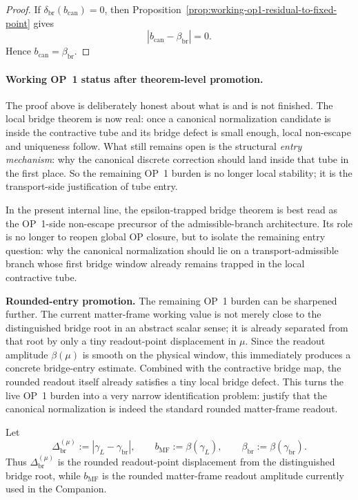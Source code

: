 \begin{proof}
If \(\delta_{\mathrm{br}}(b_{\mathrm{can}})=0\), then Proposition~\ref{prop:working-op1-residual-to-fixed-point} gives
\[
  |b_{\mathrm{can}}-\beta_{\mathrm{br}}|=0.
\]
Hence \(b_{\mathrm{can}}=\beta_{\mathrm{br}}\).
\end{proof}

\paragraph{Working OP~1 status after theorem-level promotion.}
The proof above is deliberately honest about what is and is not finished. The local bridge theorem is now real: once a canonical normalization candidate is inside the contractive tube and its bridge defect is small enough, local non-escape and uniqueness follow. What still remains open is the structural \emph{entry mechanism}: why the canonical discrete correction should land inside that tube in the first place. So the remaining OP~1 burden is no longer local stability; it is the transport-side justification of tube entry.

\begin{remark}
In the present internal line, the epsilon-trapped bridge theorem is best read as the OP~1-side non-escape precursor of the admissible-branch architecture. Its role is no longer to reopen global OP closure, but to isolate the remaining entry question: why the canonical normalization should lie on a transport-admissible branch whose first bridge window already remains trapped in the local contractive tube.
\end{remark}


\noindent\textbf{Rounded-entry promotion.} The remaining OP~1 burden can be sharpened further. The current matter-frame working value is not merely close to the distinguished bridge root in an abstract scalar sense; it is already separated from that root by only a tiny readout-point displacement in \(\mu\). Since the readout amplitude \(\beta(\mu)\) is smooth on the physical window, this immediately produces a concrete bridge-entry estimate. Combined with the contractive bridge map, the rounded readout itself already satisfies a tiny local bridge defect. This turns the live OP~1 burden into a very narrow identification problem: justify that the canonical normalization is indeed the standard rounded matter-frame readout.

\begin{definition}
\label{def:working-op1-rounded-gap}
Let
\[
  \Delta^{(\mu)}_{\mathrm{br}}
  :=
  |\gamma_L-\gamma_{\mathrm{br}}|,
  \qquad
  b_{\mathrm{MF}}:=\beta(\gamma_L),
  \qquad
  \beta_{\mathrm{br}}:=\beta(\gamma_{\mathrm{br}}).
\]
Thus \(\Delta^{(\mu)}_{\mathrm{br}}\) is the rounded readout-point displacement from the distinguished bridge root, while \(b_{\mathrm{MF}}\) is the rounded matter-frame readout amplitude currently used in the Companion.
\end{definition}

